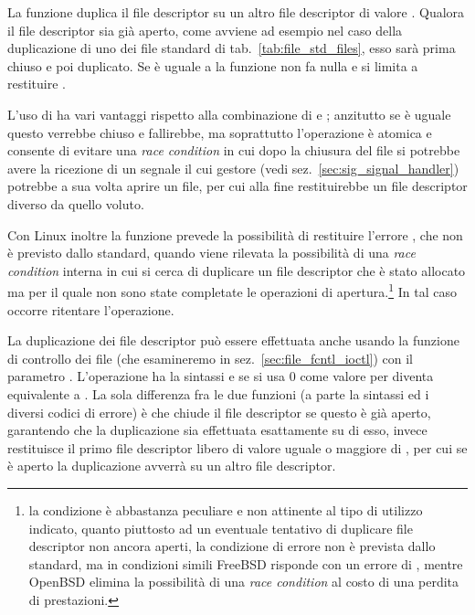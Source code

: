 La funzione duplica il file descriptor  su un altro file
descriptor di valore . Qualora il file descriptor 
sia già aperto, come avviene ad esempio nel caso della duplicazione di uno dei
file standard di tab.~\ref{tab:file_std_files}, esso sarà prima chiuso e poi
duplicato. Se  è uguale a  la funzione non fa nulla
e si limita a restituire .

L'uso di  ha vari vantaggi rispetto alla combinazione di
 e ; anzitutto se  è uguale 
questo verrebbe chiuso e  fallirebbe, ma soprattutto l'operazione è
atomica e consente di evitare una \textit{race condition} in cui dopo la
chiusura del file si potrebbe avere la ricezione di un segnale il cui gestore
(vedi sez.~\ref{sec:sig_signal_handler}) potrebbe a sua volta aprire un file,
per cui alla fine  restituirebbe un file descriptor diverso da
quello voluto.

Con Linux inoltre la funzione prevede la possibilità di restituire l'errore
, che non è previsto dallo standard, quando viene rilevata la
possibilità di una \textit{race condition} interna in cui si cerca di
duplicare un file descriptor che è stato allocato ma per il quale non sono
state completate le operazioni di apertura.\footnote{la condizione è
  abbastanza peculiare e non attinente al tipo di utilizzo indicato, quanto
  piuttosto ad un eventuale tentativo di duplicare file descriptor non ancora
  aperti, la condizione di errore non è prevista dallo standard, ma in
  condizioni simili FreeBSD risponde con un errore di , mentre
  OpenBSD elimina la possibilità di una \textit{race condition} al costo di
  una perdita di prestazioni.} In tal caso occorre ritentare l'operazione.

La duplicazione dei file descriptor può essere effettuata anche usando la
funzione di controllo dei file  (che esamineremo in
sez.~\ref{sec:file_fcntl_ioctl}) con il parametro .
L'operazione ha la sintassi  e se si usa 0
come valore per  diventa equivalente a .  La sola
differenza fra le due funzioni (a parte la sintassi ed i diversi codici di
errore) è che  chiude il file descriptor  se questo è
già aperto, garantendo che la duplicazione sia effettuata esattamente su di
esso, invece  restituisce il primo file descriptor libero di
valore uguale o maggiore di , per cui se  è aperto
la duplicazione avverrà su un altro file descriptor.

